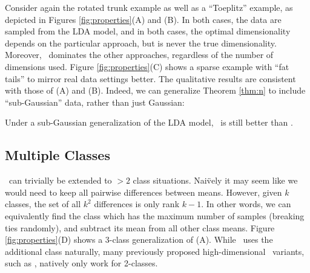 \documentclass[10pt]{article}
\begin{document}
Consider again the rotated trunk example as well as a ``Toeplitz'' example, as depicted in Figures \ref{fig:properties}(A) and (B).  In both cases, the data are sampled from the LDA model, and in both cases, the optimal dimensionality depends on the particular approach, but is never the true dimensionality.  Moreover, \Lol~dominates the other approaches, regardless of the number of dimensions used.
% 
Figure \ref{fig:properties}(C) shows a sparse example with ``fat tails'' to mirror real data settings better.  The qualitative results are consistent with those of (A) and (B).  Indeed, we can generalize Theorem \ref{thm:n} to include ``sub-Gaussian'' data, rather than just Gaussian:

\begin{thm} \label{thm:FAT}
Under a sub-Gaussian generalization of the LDA model, \Lol~is still better than \Pca.
\end{thm}

\subsection*{Multiple Classes}

\Lol~can trivially be extended to $>2$ class situations.  Nai\"vely it may seem like we would need to keep all pairwise differences between means.  However, given $k$ classes, the set of all $k^2$ differences is only rank $k-1$.  In other words, we can equivalently find the class which has the maximum number of samples (breaking ties randomly), and subtract its mean from all other class means.  Figure \ref{fig:properties}(D) shows a 3-class generalization of (A).  While \Lol~uses the additional class naturally,  many previously proposed high-dimensional \Fld~variants, such as , natively only work for 2-classes.
\end{document}
